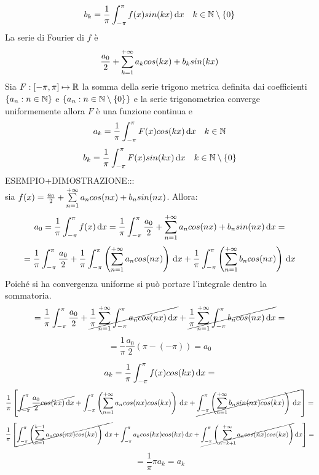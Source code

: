 $$b_k=\frac{1}{\pi}\int_{-\pi}^{\pi}f(x)sin(kx)\,\mathrm{d}{x}\quad k\in\mathbb{N}\setminus{\left\{0\right\}}$$
La serie di Fourier di $f$ è
$$\frac{a_0}{2}+\sum\limits_{k=1}^{+\infty}a_{k}cos(kx)+b_{k}sin(kx)$$
\proposition
Sia $F: \left[-\pi,\pi\right] \mapsto \mathbb{R}$ la somma della serie trigono metrica definita dai coefficienti $\left\{a_n:n\in\mathbb{N}\right\}$ e $\left\{a_n:n\in\mathbb{N}\setminus{\left\{0\right\}}\right\}$ e la serie trigonometrica converge uniformemente allora $F$ è una funzione continua e
$$a_k=\frac{1}{\pi}\int_{-\pi}^{\pi}F(x)cos(kx)\,\mathrm{d}{x}\quad k\in\mathbb{N}$$
$$b_k=\frac{1}{\pi}\int_{-\pi}^{\pi}F(x)sin(kx)\,\mathrm{d}{x}\quad k\in\mathbb{N}\setminus{\left\{0\right\}}$$
ESEMPIO+DIMOSTRAZIONE:::\\
sia $f(x)=\frac{a_0}{2}+\sum\limits_{n=1}^{+\infty}a_{n}cos(nx)+b_{n}sin(nx)$. Allora:\\
$$a_0=\frac{1}{\pi}\int_{-\pi}^{\pi}f(x)\,\mathrm{d}{x}=\frac{1}{\pi}\int_{-\pi}^{\pi}\frac{a_0}{2}+\sum\limits_{n=1}^{+\infty}a_{n}cos(nx)+b_{n}sin(nx)\,\mathrm{d}{x}=$$
$$
= \frac{1}{\pi}\int_{-\pi}^{\pi}\frac{a_0}{2} +
\frac{1}{\pi}\int_{-\pi}^{\pi}\left(\sum\limits_{n=1}^{+\infty} a_ncos(nx)\right)\,\mathrm{d}{x} +
\frac{1}{\pi}\int_{-\pi}^{\pi}\left(\sum\limits_{n=1}^{+\infty} b_ncos(nx)\right)\,\mathrm{d}{x}
$$
Poiché si ha convergenza uniforme si può portare l'integrale dentro la sommatoria.
$$
= \frac{1}{\pi}\int_{-\pi}^{\pi}\frac{a_0}{2} +
\cancel{\frac{1}{\pi}\sum\limits_{n=1}^{+\infty}\int_{-\pi}^{\pi} a_ncos(nx)\,\mathrm{d}{x}} +
\cancel{\frac{1}{\pi}\sum\limits_{n=1}^{+\infty}\int_{-\pi}^{\pi} b_ncos(nx)\,\mathrm{d}{x}}=
$$
$$=\frac{1}{\pi}\frac{a_0}{2}\left(\pi-(-\pi)\right)=a_0$$


$$a_k=\frac{1}{\pi}\int_{-\pi}^{\pi}f(x)cos(kx)\,\mathrm{d}{x}=$$
$$\frac{1}{\pi}\left[
\cancel{\int_{-\pi}^{\pi}\frac{a_0}{2}cos(kx)\,\mathrm{d}{x}}+
\int_{-\pi}^{\pi}\left(\sum\limits_{n=1}^{+\infty}a_ncos(nx)cos(kx)\right)\,\mathrm{d}{x}+
\cancel{\int_{-\pi}^{\pi}\left(\sum\limits_{n=1}^{+\infty}b_nsin(nx)cos(kx)\right)\,\mathrm{d}{x}}
\right]=$$
$$\frac{1}{\pi}\left[
\cancel{\int_{-\pi}^{\pi}\left(\sum\limits_{n=1}^{k-1} a_ncos(nx)cos(kx)\right)\,\mathrm{d}{x}}+
\int_{-\pi}^{\pi}a_kcos(kx)cos(kx)\,\mathrm{d}{x}+
\cancel{\int_{-\pi}^{\pi}\left(\sum\limits_{n=k+1}^{+\infty}a_ncos(nx)cos(kx)\right)}\,\mathrm{d}{x}
\right]=$$
$$=\frac{1}{\pi}\pi a_k=a_k$$

